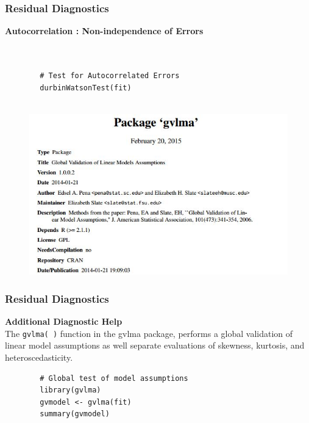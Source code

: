 \documentclass{beamer}
\begin{document}
\begin{frame}[fragile]
	\frametitle{Residual Diagnostics}
	\large
	\textbf{Autocorrelation : Non-independence of Errors}
	\begin{framed}
		\begin{verbatim}
		
		
		# Test for Autocorrelated Errors
		durbinWatsonTest(fit)
		
		\end{verbatim}
	\end{framed}
\end{frame}
\begin{frame}
	\begin{figure}
\centering
\includegraphics[width=1.1\linewidth]{images/CRAN-gvlma}
\caption{}
\label{fig:CRAN-gvlma}
\end{figure}

\end{frame}
\begin{frame}[fragile]
	\frametitle{Residual Diagnostics}
	
	\noindent \textbf{Additional Diagnostic Help}\\
	The \texttt{gvlma( )} function in the gvlma package, performs a global validation of linear model assumptions as well separate evaluations of skewness, kurtosis, and heteroscedasticity.
	
	\begin{framed}
		\begin{verbatim}
		# Global test of model assumptions
		library(gvlma)
		gvmodel <- gvlma(fit) 
		summary(gvmodel)
		
		\end{verbatim}
	\end{framed}
\end{frame}
\end{document}
